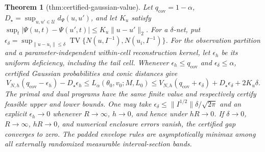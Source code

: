 \documentclass{article}
\newtheorem{theorem}{Theorem}
\begin{document}
\begin{theorem}[thm:certified-gaussian-value]\label{thm:certified-gaussian-value}
Let \(q_{\mathrm{cov}}=1-\alpha\), \(D_\star=\sup_{u,u'\in\mathcal U}d_\Psi(u,u')\), and let \(K_u\) satisfy \(\sup_t|\Psi(u,t)-\Psi(u',t)|\leq K_u\|u-u'\|_2\). For a \(\delta\)-net, put \(\epsilon_\delta=\sup_{\|u-u_i\|\leq\delta}\operatorname{TV}\{N(u,I^{-1}),N(u_i,I^{-1})\}\). For the observation partition and a parameter-independent within-cell reconstruction kernel, let \(\epsilon_h\) be its uniform deficiency, including the tail cell. Whenever \(\epsilon_h\leq q_{\mathrm{cov}}\) and \(\epsilon_\delta\leq\alpha\), certified Gaussian probabilities and conic distances give
\[
V_{N,h}(q_{\mathrm{cov}}-\epsilon_h)-D_\star\epsilon_h
\leq L_\alpha(\theta_0,v_0;M,L_0)
\leq V_{N,h}(q_{\mathrm{cov}}+\epsilon_\delta)+D_\star\epsilon_\delta+2K_u\delta.
\]
The primal and dual programs have the same finite value and respectively certify feasible upper and lower bounds. One may take \(\epsilon_\delta\leq\|I^{1/2}\|\delta/\sqrt{2\pi}\) and an explicit \(\epsilon_h\to0\) whenever \(R\to\infty\), \(h\to0\), and hence under \(hR\to0\). If \(\delta\to0\), \(R\to\infty\), \(hR\to0\), and numerical enclosure errors vanish, the certified gap converges to zero. The padded envelope rules are asymptotically minimax among all externally randomized measurable interval-section bands.
\end{theorem}
\end{document}

